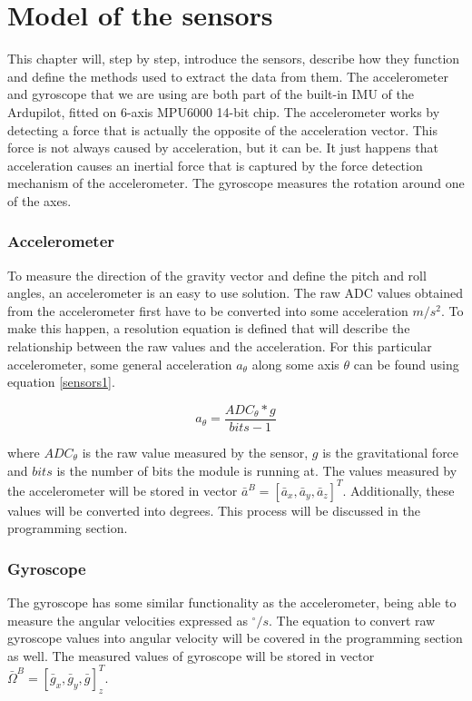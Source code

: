 \section{Model of the sensors}

This chapter will, step by step, introduce the sensors, describe how they function and define the methods used to extract the data from them. The accelerometer and gyroscope that we are using are both part of the built-in IMU of the Ardupilot, fitted on 6-axis MPU6000 14-bit chip. The accelerometer works by detecting a force that is actually the opposite of the acceleration vector. This force is not always caused by acceleration, but it can be. It just happens that acceleration causes an inertial force that is captured by the force detection mechanism of the accelerometer. The gyroscope measures the rotation around one of the axes.

\subsubsection{Accelerometer}

To measure the direction of the gravity vector and define the pitch and roll angles, an accelerometer is an easy to use solution.
The raw ADC values obtained from the accelerometer first have to be converted into some acceleration $m/s^2$. To make this happen, a resolution equation is defined that will describe the relationship between the raw values and the acceleration.
For this particular accelerometer, some general acceleration $a_\theta $ along some axis $\theta$ can be found using equation \ref{sensors1}.

\begin{equation}
\label{sensors1}	
 	a_\theta = \frac{ADC_\theta * g}{bits-1}
\end{equation}

where $ADC_\theta $ is the raw value measured by the sensor, $g$ is the gravitational force and $bits$ is the number of bits the module is running at.
The values measured by the accelerometer will be stored in vector $\bar{a}^B = [\bar{a}_x, \bar{a}_y, \bar{a}_z]^T$. Additionally, these values will be converted into degrees. This process will be discussed in the programming section.

\subsubsection{Gyroscope}

The gyroscope has some similar functionality as the accelerometer, being able to measure the angular velocities expressed as $^{\circ}/s$. The equation to convert raw gyroscope values into angular velocity will be covered in the programming section as well. The measured values of gyroscope will be stored in vector $\bar{\Omega}^B = [\bar{g}_x, \bar{g}_y, \bar{g}]_z^T$.

